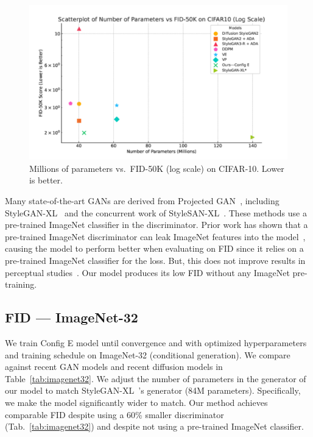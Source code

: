 \begin{figure}
    \vspace{-0.4cm}
    \centering
    \includegraphics[width=\linewidth,clip,trim={0 0 0 2cm}]{figures/Scatterplot-FID-Parameters-CIFAR10.pdf}
    \caption{Millions of parameters vs.~FID-50K (log scale) on CIFAR-10. Lower is better.}
    \label{fig:fid-50k-vs-params-cifar-10}
\end{figure}

Many state-of-the-art GANs are derived from Projected GAN~\cite{sauer2021projected}, including StyleGAN-XL~\cite{sgxl} and the concurrent work of StyleSAN-XL~\cite{takida2024san}. These methods use a pre-trained ImageNet classifier in the discriminator. Prior work has shown that a pre-trained ImageNet discriminator can leak ImageNet features into the model~\cite{kynkaanniemi2022role}, causing the model to perform better when evaluating on FID since it relies on a pre-trained ImageNet classifier for the loss. But, this does not improve results in perceptual studies~\cite{kynkaanniemi2022role}. Our model produces its low FID without any ImageNet pre-training.





\subsection{FID --- ImageNet-32~\cite{chrabaszcz2017downsampled}}
\label{sec:imagenet32-fid-explain}
We train Config E model until convergence and with optimized hyperparameters and training schedule on ImageNet-32 (conditional generation). We compare against recent GAN models and recent diffusion models in Table~\ref{tab:imagenet32}.
We adjust the number of parameters in the generator of our model to match StyleGAN-XL~\cite{sgxl}'s generator (84M parameters). Specifically, we make the model significantly wider to match. Our method achieves comparable FID despite using a 60\% smaller discriminator (Tab.~\ref{tab:imagenet32}) and despite not using a pre-trained ImageNet classifier.

